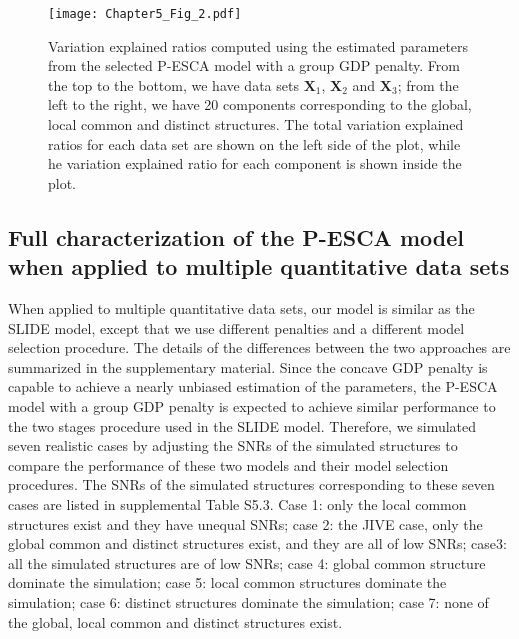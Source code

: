 \begin{figure}[h]
    \centering
    \texttt{[image: Chapter5\_Fig\_2.pdf]}
    \caption{Variation explained ratios computed using the estimated parameters from the selected P-ESCA model with a group GDP penalty. From the top to the bottom, we have data sets $\mathbf{X}_1$, $\mathbf{X}_2$ and $\mathbf{X}_3$; from the left to the right, we have 20 components corresponding to the global, local common and distinct structures. The total variation explained ratios for each data set are shown on the left side of the plot, while he variation explained ratio for each component is shown inside the plot.}
	\label{chapter5_fig:2}
\end{figure}

\subsection{Full characterization of the P-ESCA model when applied to multiple quantitative data sets}
When applied to multiple quantitative data sets, our model is similar as the SLIDE model, except that we use different penalties and a different model selection procedure. The details of the differences between the two approaches are summarized in the supplementary material. Since the concave GDP penalty is capable to achieve a nearly unbiased estimation of the parameters, the P-ESCA model with a group GDP penalty is expected to achieve similar performance to the two stages procedure used in the SLIDE model. Therefore, we simulated seven realistic cases by adjusting the SNRs of the simulated structures to compare the performance of these two models and their model selection procedures. The SNRs of the simulated structures corresponding to these seven cases are listed in supplemental Table S5.3. Case 1: only the local common structures exist and they have unequal SNRs; case 2: the JIVE case, only the global common and distinct structures exist, and they are all of low SNRs; case3: all the simulated structures are of low SNRs; case 4: global common structure dominate the simulation; case 5: local common structures dominate the simulation; case 6: distinct structures dominate the simulation; case 7: none of the global, local common and distinct structures exist.

